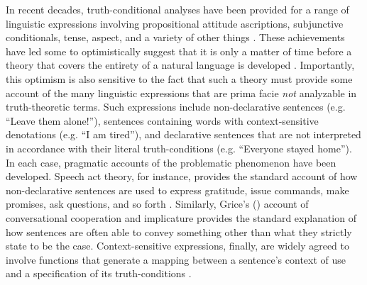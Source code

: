 In recent decades, truth-conditional analyses have been provided for a range of linguistic expressions involving propositional attitude ascriptions, subjunctive conditionals, tense, aspect, and a variety of other things \citep{Carpenter:1997,Soames:2010,Stanley:2008,Speaks:2014}. These achievements have led some to optimistically suggest that it is only a matter of time before a theory that covers the entirety of a natural language is developed \citep[e.g.][]{Soames:2010}. Importantly, this optimism is also sensitive to the fact that such a theory must provide some account of the many linguistic expressions that are prima facie \textit{not} analyzable in truth-theoretic terms. Such expressions include non-declarative sentences (e.g. ``Leave them alone!''), sentences containing words with context-sensitive denotations (e.g. ``I am tired''), and declarative sentences that are not interpreted in accordance with their literal truth-conditions (e.g. ``Everyone stayed home''). In each case, pragmatic accounts of the problematic phenomenon have been developed. Speech act theory, for instance, provides the standard account of how non-declarative sentences are used to express gratitude, issue commands, make promises, ask questions, and so forth \citep{Austin:1962,Searle:1969}. Similarly, Grice's (\citeyear{Grice:1975}) account of conversational cooperation and implicature provides the standard explanation of how sentences are often able to convey something other than what they strictly state to be the case. Context-sensitive expressions, finally, are widely agreed to involve functions that generate a mapping between a sentence's context of use and a specification of its truth-conditions \citep{Soames:2010,Recanati:2012,Recanati:2004,CappelenLepore:2005}. 

